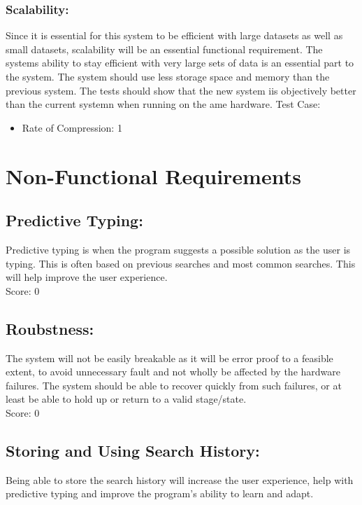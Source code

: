 \documentclass[11pt]{article}
\begin{document}
	\subsubsection{Scalability:}
	Since it is essential for this system to be efficient with large datasets as well as small datasets, scalability will be an essential functional requirement. The systems ability to stay efficient with very large sets of data is an essential part to the system. The system should use less storage space and memory than the previous system. The tests should show that the new system iis objectively better than the current systemn when running on the ame hardware.	
	Test Case:
	\begin{itemize}
      	  	\item Rate of Compression: 1
        \end{itemize}

	\section{Non-Functional Requirements}	
	\subsection{Predictive Typing:}
Predictive typing is when the program suggests a possible solution as the user is typing. This is often based on previous searches and most common searches. This will help improve the user experience. \\
    
	Score: 0    
    \subsection{Roubstness:}
The system will not be easily breakable as it will be error proof to a feasible extent, to avoid unnecessary fault and not wholly be affected by the hardware failures. The system should be able to recover quickly from such failures, or at least be able to hold up or return to a valid stage/state.\\
    
	Score: 0    
    \subsection{Storing and Using Search History:}
	Being able to store the search history will increase the user experience, help with predictive typing and improve the program's ability to learn and adapt.\\
\end{document}
